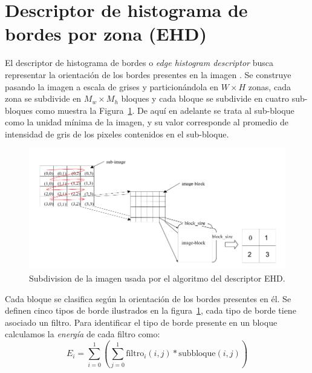 \section{Descriptor de histograma de bordes por zona (EHD)}\label{ehd}
El descriptor de histograma de bordes o \emph{edge histogram descriptor} busca representar la orientación de los bordes presentes en la imagen \cite{ParkJW00:ehd, Manjunath:desc}. Se construye pasando la imagen a escala de grises y particionándola en $W \times H$ zonas, cada zona se subdivide en $M_w \times M_h$ bloques y cada bloque se subdivide en cuatro sub-bloques como muestra la Figura~\ref{ehd_blocks}. De aquí en adelante se trata al sub-bloque como la unidad mínima de la imagen, y su valor corresponde al promedio de intensidad de gris de los pixeles contenidos en el sub-bloque.
    \begin{figure}[!h]
		\centering
		\includegraphics[scale=0.45]{imagenes/cap3/ehd_blocks.png}
		\caption{Subdivision de la imagen usada por el algoritmo del descriptor EHD.}
		\label{ehd_blocks}
	\end{figure}
Cada bloque se clasifica según la orientación de los bordes presentes en él. Se definen cinco tipos de borde ilustrados en la figura~\ref{ehd_blocks}, cada tipo de borde tiene asociado un filtro. Para identificar el tipo de borde presente en un bloque calculamos la \emph{energía} de cada filtro como: 
\begin{equation*}
E_i =  \displaystyle\sum_{i=0}^{1} \left(\displaystyle\sum_{j=0}^{1} \text{filtro}_i(i,j) * \text{subbloque}(i,j)\right)
\end{equation*}

